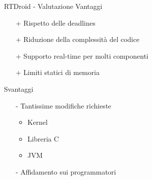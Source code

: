 \begin{frame}{RTDroid - Valutazione}
	Vantaggi
	\begin{itemize}
		\item[+] Rispetto delle deadlines
		\item[+] Riduzione della complessità del codice
		\item[+] Supporto real-time per molti componenti
		\item[+] Limiti statici di memoria
	\end{itemize}
	\vspace{10px}
	Svantaggi
	\begin{itemize}
		\item[-] Tantissime modifiche richieste
		\begin{itemize}
			\item Kernel
			\item Libreria C
			\item JVM
		\end{itemize}
		\item[-] Affidamento sui programmatori
	\end{itemize}
\end{frame}